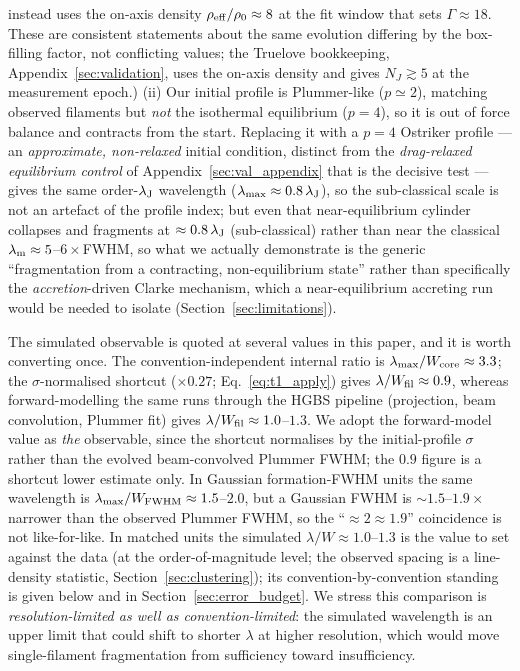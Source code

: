\documentclass[usenatbib,twoside,twocolumn]{mnras}
\begin{document}
instead uses the on-axis density $\rho_{\rm eff}/\rho_0\approx8$ at the fit window that sets $\Gamma\approx18$. These are consistent statements about the same evolution differing by the box-filling factor, not conflicting values; the Truelove bookkeeping, Appendix~\ref{sec:validation}, uses the on-axis density and gives $N_J\gtrsim5$ at the measurement epoch.) (ii) Our initial profile is Plummer-like ($p\simeq2$), matching observed filaments but \emph{not} the isothermal equilibrium ($p=4$), so it is out of force balance and contracts from the start. Replacing it with a $p=4$ Ostriker profile --- an \emph{approximate, non-relaxed} initial condition, distinct from the \emph{drag-relaxed equilibrium control} of Appendix~\ref{sec:val_appendix} that is the decisive test --- gives the same order-$\lambda_{\rm J}$ wavelength ($\lambda_{\rm max}\approx0.8\,\lambda_{\rm J}$), so the sub-classical scale is not an artefact of the profile index; but even that near-equilibrium cylinder collapses and fragments at $\approx0.8\,\lambda_{\rm J}$ (sub-classical) rather than near the classical $\lambda_{\rm m}\approx5$--$6\times$FWHM, so what we actually demonstrate is the generic ``fragmentation from a contracting, non-equilibrium state'' rather than specifically the \emph{accretion}-driven Clarke mechanism, which a near-equilibrium accreting run would be needed to isolate (Section~\ref{sec:limitations}).

The simulated observable is quoted at several values in this paper, and it is worth converting once. The convention-independent internal ratio is $\lambda_{\rm max}/W_{\rm core}\approx3.3$; the $\sigma$-normalised shortcut ($\times0.27$; Eq.~\ref{eq:t1_apply}) gives $\lambda/W_{\rm fil}\approx0.9$, whereas forward-modelling the same runs through the HGBS pipeline (projection, beam convolution, Plummer fit) gives $\lambda/W_{\rm fil}\approx1.0$--$1.3$. We adopt the forward-model value as \emph{the} observable, since the shortcut normalises by the initial-profile $\sigma$ rather than the evolved beam-convolved Plummer FWHM; the $0.9$ figure is a shortcut lower estimate only. In Gaussian formation-FWHM units the same wavelength is $\lambda_{\rm max}/W_{\rm FWHM}\approx1.5$--$2.0$, but a Gaussian FWHM is $\sim1.5$--$1.9\times$ narrower than the observed Plummer FWHM, so the ``$\approx2\approx1.9$'' coincidence is not like-for-like. In matched units the simulated $\lambda/W\approx1.0$--$1.3$ is the value to set against the data (at the order-of-magnitude level; the observed spacing is a line-density statistic, Section~\ref{sec:clustering}); its convention-by-convention standing is given below and in Section~\ref{sec:error_budget}. We stress this comparison is \emph{resolution-limited as well as convention-limited}: the simulated wavelength is an upper limit that could shift to shorter $\lambda$ at higher resolution, which would move single-filament fragmentation from sufficiency toward insufficiency.
\end{document}
